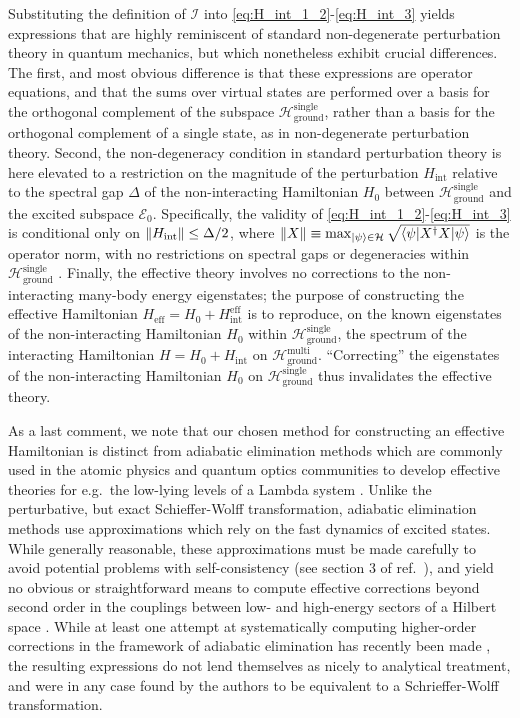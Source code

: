 \documentclass[preprint,showkeys,nofootinbib]{revtex4-1}
\renewcommand{\t}{\text} %
\newcommand{\bk}{\braket} %
\newcommand{\E}{\mathcal{E}}
\renewcommand{\H}{\mathcal{H}}
\newcommand{\I}{\mathcal{I}}
\newcommand{\1}{\mathds{1}}
\begin{document}
Substituting the definition of $\I$ into
\eqref{eq:H_int_1_2}-\eqref{eq:H_int_3} yields expressions that are
highly reminiscent of standard non-degenerate perturbation theory in
quantum mechanics, but which nonetheless exhibit crucial differences.
The first, and most obvious difference is that these expressions are
operator equations, and that the sums over virtual states are
performed over a basis for the orthogonal complement of the subspace
$\H_{\t{ground}}^{\t{single}}$, rather than a basis for the orthogonal
complement of a single state, as in non-degenerate perturbation
theory.  Second, the non-degeneracy condition in standard perturbation
theory is here elevated to a restriction on the magnitude of the
perturbation $H_{\t{int}}$ relative to the spectral gap $\Delta$ of
the non-interacting Hamiltonian $H_0$ between
$\H_{\t{ground}}^{\t{single}}$ and the excited subspace $\E_0$.
Specifically, the validity of \eqref{eq:H_int_1_2}-\eqref{eq:H_int_3}
is conditional only on $\norm{H_{\t{int}}}\le\Delta/2$, where
$\norm{X}\equiv\max_{\ket\psi\in\H}\sqrt{\bk{\psi|X^\dag X|\psi}}$ is
the operator norm, with no restrictions on spectral gaps or
degeneracies within $\H_{\t{ground}}^{\t{single}}$ \cite{davis1969new,
  bravyi2011schrieffer}.  Finally, the effective theory involves no
corrections to the non-interacting many-body energy eigenstates; the
purpose of constructing the effective Hamiltonian
$H_{\t{eff}} = H_0 + H_{\t{int}}^{\t{eff}}$ is to reproduce, on the
known eigenstates of the non-interacting Hamiltonian $H_0$ within
$\H_{\t{ground}}^{\t{single}}$, the spectrum of the interacting
Hamiltonian $H = H_0 + H_{\t{int}}$ on $\H_{\t{ground}}^{\t{multi}}$.
``Correcting'' the eigenstates of the non-interacting Hamiltonian
$H_0$ on $\H_{\t{ground}}^{\t{single}}$ thus invalidates the effective
theory.

As a last comment, we note that our chosen method for constructing an
effective Hamiltonian is distinct from adiabatic elimination methods
which are commonly used in the atomic physics and quantum optics
communities to develop effective theories for e.g.~the low-lying
levels of a Lambda system \cite{brion2007adiabatic,
  james2007effective, reiter2012effective, sanz2016adiabatic}.  Unlike
the perturbative, but exact Schieffer-Wolff transformation, adiabatic
elimination methods use approximations which rely on the fast dynamics
of excited states.  While generally reasonable, these approximations
must be made carefully to avoid potential problems with
self-consistency (see section 3 of ref.~\cite{brion2007adiabatic}),
and yield no obvious or straightforward means to compute effective
corrections beyond second order in the couplings between low- and
high-energy sectors of a Hilbert space \cite{james2007effective,
  reiter2012effective, sanz2016adiabatic}.  While at least one attempt
at systematically computing higher-order corrections in the framework
of adiabatic elimination has recently been made
\cite{sanz2016adiabatic}, the resulting expressions do not lend
themselves as nicely to analytical treatment, and were in any case
found by the authors to be equivalent to a Schrieffer-Wolff
transformation.
\end{document}
